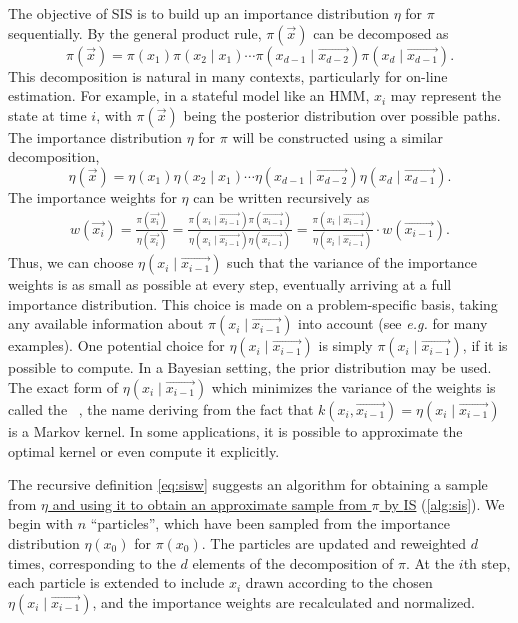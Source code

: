 {The objective of \gls{SIS} is to build up an importance distribution $\eta$ for
$\pi$ sequentially. By the general product rule, $\pi(\vec{x})$ can be
decomposed as
\[
  \pi(\vec{x}) 
  = \pi(x_1) \pi(x_2 \mid x_1) \cdots
    \pi(x_{d-1} \mid \vec{x_{d-2}}) \pi(x_d \mid \vec{x_{d-1}}).
\]
This decomposition is natural in many contexts, particularly for on-line
estimation. For example, in a stateful model like an \gls{HMM}, $x_i$ may
represent the state at time $i$, with $\pi(\vec{x})$ being the posterior
distribution over possible paths. The importance distribution $\eta$ for $\pi$
will be constructed using a similar decomposition,
\[
  \eta(\vec{x}) 
  = \eta(x_1) \eta(x_2 \mid x_1) \cdots
    \eta(x_{d-1} \mid \vec{x_{d-2}}) \eta(x_d \mid \vec{x_{d-1}}).
\]
The importance weights for $\eta$ can be written recursively as
\begin{align}
  \label{eq:sisw}
  w(\vec{x_i}) = \frac{\pi(\vec{x_i})}{\eta(\vec{x_i})}
  = \frac{\pi(x_i \mid \vec{x_{i-1}})\pi(\vec{x_{i-1}})}
         {\eta(x_i \mid \vec{x_{i-1}})\eta(\vec{x_{i-1}})}
  = \frac{\pi(x_i \mid \vec{x_{i-1}})}
         {\eta(x_i \mid \vec{x_{i-1}})}\cdot w(\vec{x_{i-1}}).
\end{align}
Thus, we can choose $\eta(x_i \mid \vec{x_{i-1}})$ such that the variance of
the importance weights is as small as possible at every step, eventually
arriving at a full importance distribution. This choice is made on a
problem-specific basis, taking any available information about $\pi(x_i \mid
\vec{x_{i-1}})$ into account (see \textit{e.g.}
\autocite{smith2013sequential,liu2008monte} for many examples).  One potential
choice for $\eta(x_i \mid \vec{x_{i-1}})$ is simply $\pi(x_i \mid
\vec{x_{i-1}})$, if it is possible to compute. In a Bayesian setting, the
prior distribution may be used. The exact form of $\eta(x_i \mid
\vec{x_{i-1}})$ which minimizes the variance of the weights is called the
~\autocite{cappe2007overview}, the name deriving from the
fact that $k(x_i, \vec{x_{i-1}}) = \eta(x_i \mid \vec{x_{i-1}})$ is a Markov
kernel. In some applications, it is possible to approximate the optimal kernel
or even compute it explicitly.

The recursive definition \ref{eq:sisw} suggests an algorithm for obtaining a
sample from {\color{blue}\uline{$\eta$ and using it to obtain an approximate
sample from $\pi$ by \gls{IS}}} (\cref{alg:sis}).  We begin with $n$
``particles'', which have been sampled from the importance distribution
$\eta(x_0)$ for $\pi(x_0)$. The particles are updated and reweighted $d$ times,
corresponding to the $d$ elements of the decomposition of $\pi$. At the $i$th
step, each particle is extended to include $x_i$ drawn according to the chosen
$\eta(x_i \mid \vec{x_{i-1}})$, and the importance weights are recalculated and
normalized. 

}
